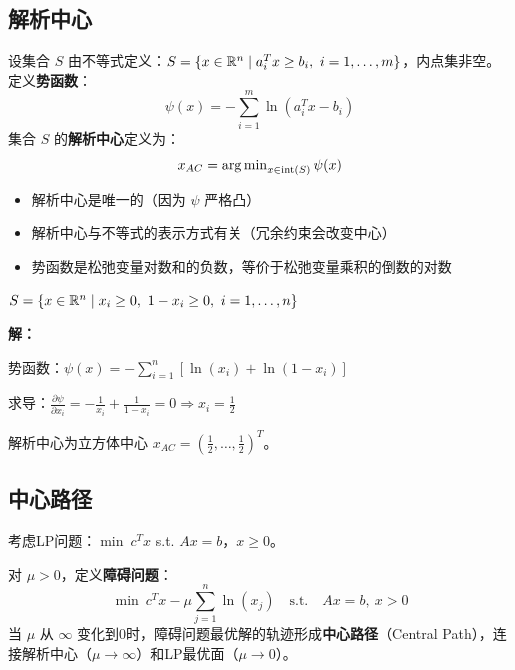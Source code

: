 \subsection{解析中心}

\begin{definition}
设集合 $S$ 由不等式定义：$S = \{x \in \mathbb{R}^n \mid a_i^T x \geq b_i,\ i = 1, \ldots, m\}$，内点集非空。定义\textbf{势函数}：
\[
\psi(x) = -\sum_{i=1}^{m} \ln(a_i^T x - b_i)
\]
集合 $S$ 的\textbf{解析中心}定义为：
\[
x_{AC} = \operatorname{arg\,min}_{x \in \text{int}(S)} \psi(x)
\]
\end{definition}

\begin{property}[解析中心性质]
\begin{itemize}[itemsep=0.3em]
    \item 解析中心是唯一的（因为 $\psi$ 严格凸）
    \item 解析中心与不等式的表示方式有关（冗余约束会改变中心）
    \item 势函数是松弛变量对数和的负数，等价于松弛变量乘积的倒数的对数
\end{itemize}
\end{property}

\begin{example}[单位立方体的解析中心]
$S = \{x \in \mathbb{R}^n \mid x_i \geq 0,\ 1 - x_i \geq 0,\ i = 1, \ldots, n\}$

\textbf{解：}

势函数：$\psi(x) = -\sum_{i=1}^{n}[\ln(x_i) + \ln(1-x_i)]$

求导：$\frac{\partial \psi}{\partial x_i} = -\frac{1}{x_i} + \frac{1}{1-x_i} = 0 \Rightarrow x_i = \frac{1}{2}$

解析中心为立方体中心 $x_{AC} = (\frac{1}{2}, \ldots, \frac{1}{2})^T$。
\end{example}

\subsection{中心路径}

考虑LP问题：$\min\ c^T x$ s.t. $Ax = b$，$x \geq 0$。

\begin{definition}[中心路径]
对 $\mu > 0$，定义\textbf{障碍问题}：
\[
\min\ c^T x - \mu \sum_{j=1}^{n} \ln(x_j)\quad \text{s.t.}\quad Ax = b,\ x > 0
\]
当 $\mu$ 从 $\infty$ 变化到0时，障碍问题最优解的轨迹形成\textbf{中心路径}（Central Path），连接解析中心（$\mu \to \infty$）和LP最优面（$\mu \to 0$）。
\end{definition}

